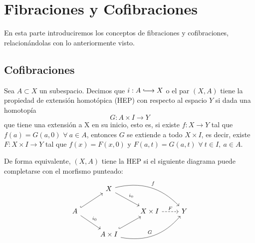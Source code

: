 \chapter{Fibraciones y Cofibraciones}
En esta parte introduciremos los conceptos de fibraciones y cofibraciones, relacionándolas con lo anteriormente visto.
\section{Cofibraciones}
\begin{defin}
Sea $A \subset X$ un subespacio. Decimos que $i : A \longhookrightarrow X$ o el par $(X, A)$ tiene la propiedad de extensión homotópica (HEP) con respecto al espacio $Y$ si dada una homotopía
\[ G : A \times I \longrightarrow Y \]
que tiene una extensión a X en su inicio, esto es, si existe $f: X \longrightarrow Y $ tal que $f(a) = G(a, 0)$ $\forall \ a \in A$, entonces $G$ se extiende a todo $X \times I$, es decir, existe $F : X \times I \longrightarrow Y$ tal que $f(x) = F(x,0)$ y $F(a,t) = G(a, t)$ $\forall \ t \in I, \ a \in A$. \par 
De forma equivalente, $(X,A)$ tiene la HEP si el siguiente diagrama puede completarse con el morfismo punteado:
\[
\begin{tikzcd}
	{} 						  & X \drar{i_0} \arrow[bend left]{drr}{f}			   &        					&   \\
	A \urar[hook] \drar{i_0}  &   												   & X \times I \rar[dashed]{F} & Y \\
	   						  & A \times I  \urar[hook] \arrow[bend right]{urr}{G} &   							&
\end{tikzcd}
\]
\end{defin}

